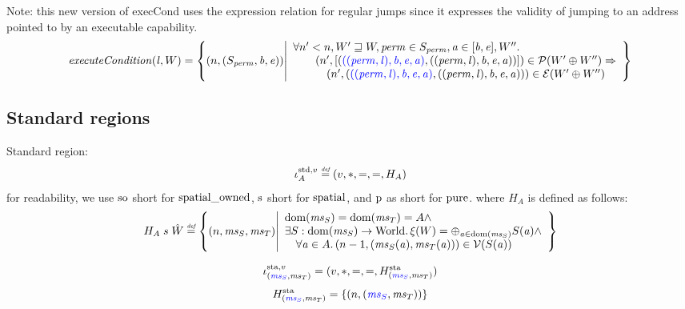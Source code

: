 \documentclass[a4paper]{article}
\begin{document}
Note: this new version of execCond uses the expression relation for regular jumps since it expresses the validity of jumping to an address pointed to by an executable capability. 
\[
  \execCond{\lin,W} = \left\{ \npair{(S_\perm,\baddr,\eaddr)} \middle|
    \begin{array}{l}
      \forall n' < n, W' \future W, \perm \in S_\perm, \aaddr \in [\baddr,\eaddr], W'' \ldotp\\
      \qquad \npair[n']{[\stpair[.]{((\perm,\lin),\baddr,\eaddr,\aaddr)}{((\perm,\lin),\baddr,\eaddr,\aaddr)}]} \in \lrp(W' \oplus W'') \Rightarrow \\
      \quad \qquad \npair[n']{\stpair[.]{((\perm,\lin),\baddr,\eaddr,\aaddr)}{((\perm,\lin),\baddr,\eaddr,\aaddr)}} \in \lre(W' \oplus W'')
    \end{array}
    \right\}
\]

\subsection{Standard regions}
\label{sec:standard-regions}
Standard region:
\[
  \stdreg{A}{v} \defeq (v,*,=,=,H_A)
\]
for readability, we use $\spao$ short for $\spatialo$, $\spa$ short for $\spatial$, and $\pur$ as short for $\pure$.
where $H_A$ is defined as follows:
\[
  H_A \; s \; \hat{W} \defeq \left\{ \npair{\ms_S,\ms_T} \middle|
    \begin{array}{l}
      \dom(\ms_S) = \dom(\ms_T) = A \wedge \\
      \exists S : \dom(\ms_S) \fun \World \ldotp \xi(W) = \oplus_{\aaddr \in \dom(\ms_S)} S(\aaddr) \wedge\\
      \quad \forall \aaddr \in A \ldotp \npair[n-1]{(\ms_S(\aaddr),\ms_T(\aaddr))} \in \lrv(S(\aaddr))
    \end{array}
  \right\}
\]

\[
  \stareg{v} = (v,*,=,=,H^\mathrm{sta}_{\stpair{\ms}{\ms}})
\]
\[
  H^\mathrm{sta}_{\stpair{\ms}{\ms}} = \{ \npair{\stpair{\ms}{\ms}} \}
\]

\end{document}
